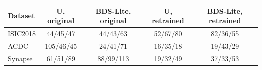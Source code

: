 \begin{tabular}{lcccc}
\toprule
Dataset & U, original & BDS-Lite, original & U, retrained & BDS-Lite, retrained \\
\midrule
ISIC2018 & 44/45/47 & 44/43/63 & 52/67/80 & 82/36/55 \\
ACDC & 105/46/45 & 24/41/71 & 16/35/18 & 19/43/29 \\
Synapse & 61/51/89 & 88/99/113 & 19/32/49 & 37/33/53 \\
\bottomrule
\end{tabular}
